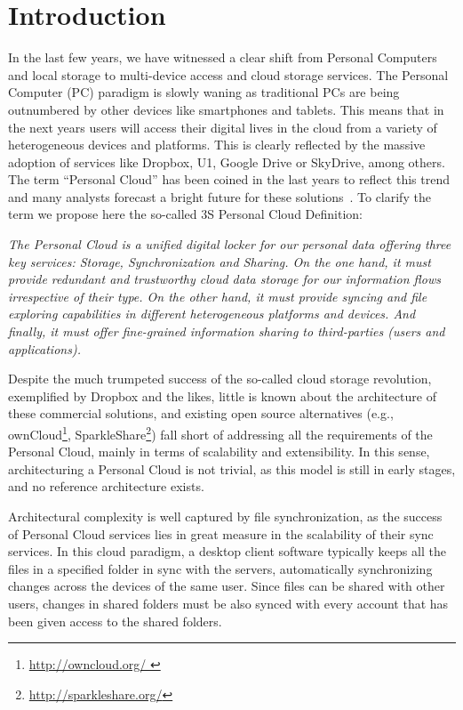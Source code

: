 \chapter{Introduction}

In the last few years, we have witnessed a clear shift from Personal Computers and local storage to multi-device access and cloud storage services. The Personal Computer (PC) paradigm is slowly waning as traditional PCs are being outnumbered by other devices like smartphones and tablets. This means that in the next years  users will access their digital lives in the cloud from a variety of heterogeneous devices and platforms. This is clearly reflected by the massive adoption of services like Dropbox, U1, Google Drive or SkyDrive, among others.  The term ``Personal Cloud'' has been coined in the last years to reflect this trend and many analysts forecast  a bright future for these solutions~\cite{forrester}\cite{gartner}. To clarify the term we propose here the so-called 3S Personal Cloud Definition:

\textit{The Personal Cloud is a unified digital  locker for our personal data offering three key services: Storage, Synchronization and Sharing.  On the one hand, it must provide redundant and trustworthy cloud data storage for our information flows irrespective of their type. On the other hand, it must provide syncing and file exploring capabilities in different heterogeneous platforms and devices. And finally, it must offer fine-grained information sharing to third-parties (users and applications).}

Despite the much trumpeted success of the so-called cloud storage revolution, exemplified by Dropbox and the 
likes, little is known about the architecture of these commercial solutions, and existing open source alternatives 
(e.g., ownCloud\footnote{\url{ http://owncloud.org/ }}, SparkleShare\footnote{\url{ http://sparkleshare.org/}})
fall short of addressing all the requirements of the Personal Cloud, mainly in terms of scalability and extensibility. 
In this sense, architecturing a Personal Cloud is not trivial, as this model is still in early stages, and no reference architecture exists.

Architectural complexity is well captured by file synchronization, as the success of Personal Cloud services
lies in great measure in the scalability of their sync services. In this cloud paradigm, a desktop client
software typically keeps all the files in a specified folder in sync with the servers, automatically synchronizing changes across the devices of the same user. Since files can be shared with other users, changes in
shared folders must be also synced with every account that has been given access to the shared folders. 

